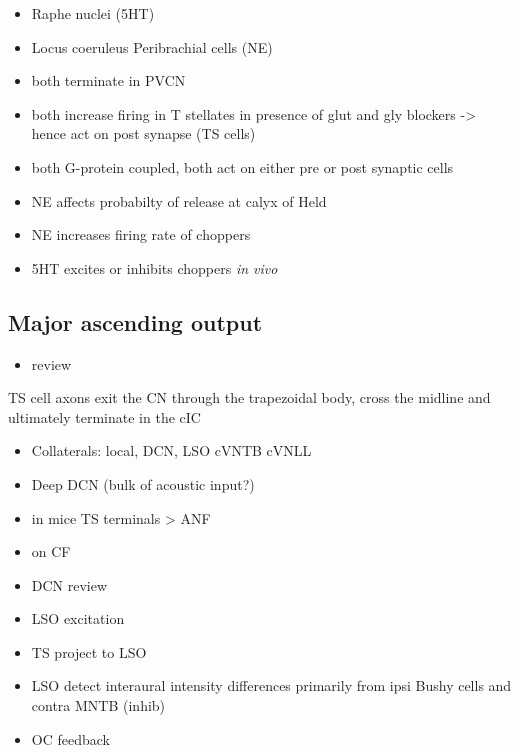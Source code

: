 \begin{itemize}
\item Raphe nuclei (5HT)
\item Locus coeruleus Peribrachial cells (NE)
\item both terminate in PVCN \citep{KlepperHerbert:1991,Thompson:2003,ThompsonLauder:2005,Thompson:2003a,ThompsonWiechmann:2002,BehrensSchofieldEtAl:2002,ThompsonThompson:2001,ThompsonThompson:2001a,ThompsonMooreEtAl:1995,ThompsonThompsonEtAl:1994}
\item both increase firing in T stellates \citep{OertelWrightEtAl:2010} in presence of glut and gly blockers -> hence act on post synapse (TS cells)
\item both G-protein coupled, both act on either pre or post synaptic cells
\item NE affects probabilty of release at calyx of Held
\item NE increases firing rate of choppers \citep{KosslVater:1989,Ebert:1996}
\item 5HT excites or inhibits choppers \emph{in vivo} \citep{EbertOstwald:1992}
\end{itemize}
\subsection{Major ascending output}
\label{sec-1_6}


\begin{itemize}
\item review \citep{DoucetRyugo:2006}
\end{itemize}

TS cell axons exit the CN through the trapezoidal body, cross the midline and ultimately terminate in the cIC \citep{Adams:1979}


\begin{itemize}
\item Collaterals: local, DCN, LSO cVNTB cVNLL \citep{Warr:1969,SmithJorisEtAl:1993,Thompson:1998,DoucetRyugo:2003}
\item Deep DCN (bulk of acoustic input?)
\item in mice TS terminals > ANF \citep{CaoMcGinleyEtAl:2008}
\item on CF \citep{SmithRhode:1989,FriedlandPongstapornEtAl:2003,DoucetRyugo:1997}
\item DCN review \citep{OertelYoung:2004}
\item LSO excitation
\item TS project to LSO \citep{Thompson:1998,DoucetRyugo:2003,ThompsonThompson:1991a}
\item LSO detect interaural intensity differences primarily from ipsi Bushy cells and contra MNTB (inhib)
\item OC feedback
\end{itemize}

